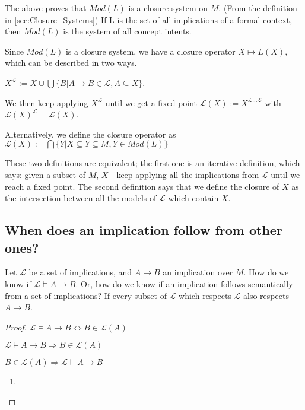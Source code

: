 The above proves that $Mod(L)$ is a closure system on $M$. (From the definition in \ref{sec:Closure_Systems}) If L is the set of all implications of a formal context, then $Mod(L)$ is the system of all concept intents. 

Since $Mod(L)$ is a closure system, we have a closure operator $X \mapsto L(X)$, which can be described in two ways. 

$X^\mathcal{L} := X \cup \bigcup\{B | A \rightarrow B \in \mathcal{L}, A \subseteq X\}$. 

We then keep applying $X^\mathcal{L}$ until we get a fixed point $\mathcal{L}(X) := X^{\mathcal{L}\dots \mathcal{L}}$ with $\mathcal{L}(X)^\mathcal{L} = \mathcal{L}(X)$. 

Alternatively, we define the closure operator as $\mathcal{L}(X) := \bigcap\{Y | X \subseteq Y \subseteq M, Y \in Mod(L)\}$ 

These two definitions are equivalent; the first one is an iterative definition, which says: given a subset of $M$, $X$ - keep applying all the implications from $\mathcal{L}$ until we reach a fixed point. The second definition says that we define the closure of $X$ as the intersection between all the models of $\mathcal{L}$ which contain $X$. 
\clearpage

\subsection{When does an implication follow from other ones?}
Let $\mathcal{L}$ be a set of implications, and $A\rightarrow B$ an implication over $M$. How do we know if $\mathcal{L} \models A\rightarrow B$. Or, how do we know if an implication follows semantically from a set of implications? If every subset of $\mathcal{L}$ which respects $\mathcal{L}$ also respects $A\rightarrow B$. 

\begin{proof}
    $\mathcal{L} \models A\rightarrow B \iff B \in \mathcal{L}(A)$

    $\mathcal{L} \models A\rightarrow B \Rightarrow B \in \mathcal{L}(A)$

    $B \in \mathcal{L}(A) \Rightarrow \mathcal{L} \models A\rightarrow B$
    \begin{enumerate}
        \item 
    \end{enumerate}
\end{proof}